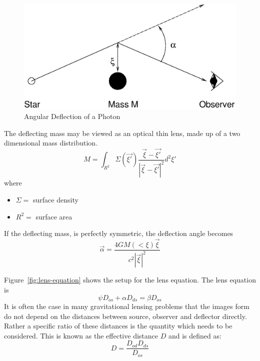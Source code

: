 \documentclass[a4paper]{IEEEtran}
\begin{document}
\begin{figure}
    \begin{center}
        \caption{Angular Deflection of a Photon} 
        \label{fig:photon} 
        \includegraphics[width=0.9\columnwidth]{images/gldiag.eps}
    \end{center}
\end{figure}

The deflecting mass may be viewed as an optical thin lens, made up
of a two dimensional mass distribution.
\begin{equation}
    M = \int_{R^2} \Sigma(\vec{\xi '}) 
        \frac{\vec{\xi} - \vec{\xi '} }{|\vec{\xi} - \vec{\xi '}|^2} d^2 \xi '
\end{equation}
where
\begin{itemize}
    \item $\Sigma = $ surface density
    \item $R^2 = $ surface area
\end{itemize}
If the deflecting mass, is perfectly symmetric, the deflection angle becomes
\begin{equation}
    \vec{\alpha} = \frac{4GM(<\xi)\vec{\xi}}{c^2|\vec{\xi}|^2}
\end{equation}

Figure~\ref{fig:lens-equation} shows the setup for the lens equation. The lens
equation is
\begin{equation}
    \psi D_{os} + \alpha D_{ds} = \beta D_{os}
\end{equation}
It is often the case in many gravitational lensing problems that 
the images form do not depend on the distances between source, observer
and deflector directly. Rather a specific ratio of these distances
is the quantity which needs to be considered. This is known as the
effective distance $D$ and is defined as:
\begin{equation}
\label{eq:effd}
    D = \frac{D_{od} D_{ds} }{D_{os}}
\end{equation}
\end{document}
